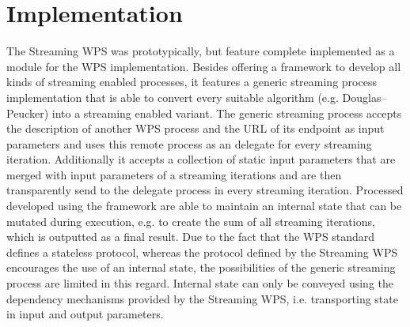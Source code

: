 	\section{Implementation}
		The Streaming WPS was prototypically, but feature complete implemented as a module for the \ftn WPS implementation. Besides offering a framework to develop all kinds of streaming enabled processes, it features a generic streaming process implementation that is able to convert every suitable algorithm (e.g. Douglas–Peucker) into a streaming enabled variant. The generic streaming process accepts the description of another WPS process and the URL of its endpoint as input parameters and uses this remote process as an delegate for every streaming iteration. Additionally it accepts a collection of static input parameters that are merged with input parameters of a streaming iterations and are then transparently send to the delegate process in every streaming iteration. Processed developed using the framework are able to maintain an internal state that can be mutated during execution, e.g. to create the sum of all streaming iterations, which is outputted as a final result. Due to the fact that the WPS standard defines a stateless protocol, whereas the protocol defined by the Streaming WPS encourages the use of an internal state, the possibilities of the generic streaming process are limited in this regard. Internal state can only be conveyed using the dependency mechanisms provided by the Streaming WPS, i.e. transporting state in input and output parameters.

